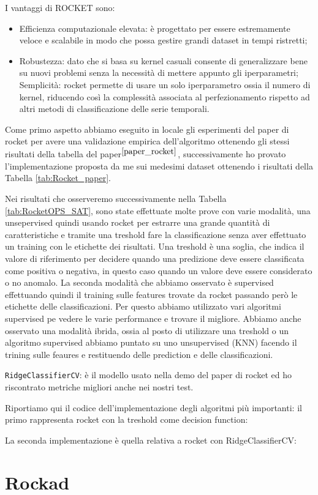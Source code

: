 I vantaggi di ROCKET sono:
\begin{itemize}
    \item Efficienza computazionale elevata: è progettato per essere estremamente veloce e scalabile in modo che possa gestire grandi dataset in tempi ristretti;
    \item Robustezza: dato che si basa su kernel casuali consente di generalizzare bene su nuovi problemi senza la necessità di mettere appunto gli iperparametri;
    Semplicità: rocket permette di usare un solo iperparametro ossia il numero di kernel, riducendo così la complessità associata al perfezionamento rispetto ad altri metodi di classificazione delle serie temporali.
\end{itemize}
Come primo aspetto abbiamo eseguito in locale gli esperimenti del paper di rocket per avere una validazione empirica dell'algoritmo ottenendo gli stessi risultati della tabella del paper$^{\cite{paper_rocket}}$, successivamente ho provato l'implementazione proposta da me sui medesimi dataset ottenendo i risultati della Tabella \ref{tab:Rocket_paper}.

\pagebrake
Nei risultati che osserveremo successivamente nella Tabella \ref{tab:RocketOPS_SAT}, sono state effettuate molte prove con varie modalità, una unsepervised quindi usando rocket per estrarre una grande quantità di caratteristiche e tramite una treshold fare la classificazione senza aver effettuato un training con le etichette dei risultati.
Una treshold è una soglia, che indica il valore di riferimento per decidere quando una predizione deve essere classificata come positiva  o negativa, in questo caso quando un valore deve essere considerato o no anomalo.
La seconda modalità che abbiamo osservato è supervised effettuando quindi il training sulle features trovate da rocket passando però le etichette delle classificazioni. Per questo abbiamo utilizzato vari algoritmi supervised pe vedere le varie performance e trovare il migliore.
Abbiamo anche osservato una modalità ibrida, ossia al posto di utilizzare una treshold o un algoritmo supervised abbiamo puntato su uno unsupervised (KNN) facendo il trining sulle feaures e restituendo delle prediction e delle classificazioni.

\texttt{RidgeClassifierCV}: è il modello usato nella demo del paper di rocket ed ho riscontrato metriche migliori anche nei nostri test.


\pagebreak
Riportiamo qui il codice dell'implementazione degli algoritmi più importanti:
il primo rappresenta rocket con la treshold come decision function:

La seconda implementazione è quella relativa a rocket con RidgeClassifierCV:


\section{Rockad}

